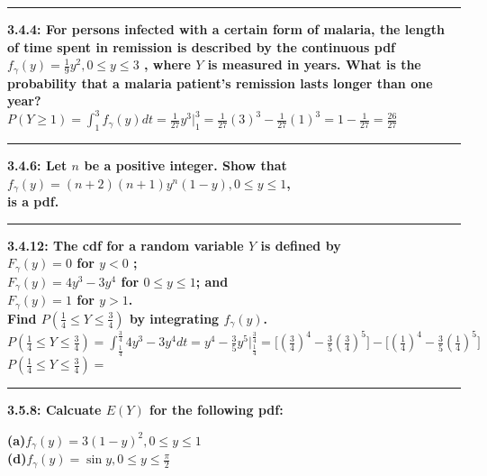 \documentclass[11pt]{article}
\newcommand\question[2]{\vspace{.25in}\hrule\textbf{#1: #2}\vspace{.5em}\vspace{.10in}}
\renewcommand\part[1]{\vspace{.10in}\textbf{(#1)}}
\begin{document}
\raggedright
\newcommand\NAME{Jonathan Lopez}  %
\newcommand\HWNUM{3}              %



\question{3.4.4}
{For persons infected with a certain form of malaria, the length of time spent in
remission is described by the continuous pdf 
$f_{\gamma} (y) = \frac{1}{9}y^{2},0 \leq y \leq 3$
, where $Y$ is measured in years. What is the probability that a malaria patient's
remission lasts longer than one year?} \\
$
P(Y \geq 1) 
= 
\int_{1}^{3}f_{\gamma}(y)dt 
= 
\frac{1}{27}y^{3} \Big|_{1}^{3}
=
\frac{1}{27}(3)^{3}-\frac{1}{27}(1)^{3}
=
1 - \frac{1}{27}
=
\frac{26}{27}
$


\question{3.4.6}
{Let $n$ be a positive integer. Show that
\\
$f_{\gamma} (y) = (n+2)(n+1)y^{n}(1-y),0 \leq y \leq 1$,
\\
is a pdf.}


\question{3.4.12}
{The cdf for a random variable $Y$ is defined by \\
$F_{\gamma} (y) = 0$ for $y < 0$ ;\\
$F_{\gamma} (y) = 4y^{3}-3y^{4}$ for $0 \leq y \leq 1$; and \\
$F_{\gamma} (y) = 1$ for $y > 1$.\\
Find 
$P(\frac{1}{4} \leq Y \leq \frac{3}{4})$
by integrating $f_{\gamma} (y)$.
}
\\
$
P(\frac{1}{4} \leq Y \leq \frac{3}{4})
=
\int_{\frac{1}{4}}^{\frac{3}{4}}4y^{3}-3y^{4}dt
=
y^{4}-\frac{3}{5}y^{5} \Big|_{\frac{1}{4}}^{\frac{3}{4}}
=
\Big[(\frac{3}{4})^4-\frac{3}{5}(\frac{3}{4})^{5}\Big]
-
\Big[(\frac{1}{4})^4-\frac{3}{5}(\frac{1}{4})^{5}\Big]
$
\\
$
P(\frac{1}{4} \leq Y \leq \frac{3}{4}) 
= 
$

\question{3.5.8}
{Calcuate $E(Y)$ for the following pdf:}

\part{a}$f_{\gamma} (y) = 3(1-y)^{2}, 0 \leq y \leq 1$
\\
\part{d}$f_{\gamma} (y) = \sin y, 0 \leq y \leq \frac{\pi}{2}$
\end{document}
